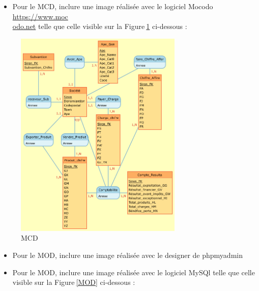 \documentclass[mstat,12pt]{unswthesis}
\begin{document}
\begin{itemize}
\tightlist
\item
  Pour le MCD, inclure une image réalisée avec le logiciel Mocodo
  \href{https://www.mocodo.net/?mcd=eNqNksFu2zAMhu96Ch0dQAOW7Zab67ZK2zTL4ixtcjEUh14FOJKhyFm3N_J9b-AX62_HaOMEAwb4Ay1SIvlLjMvNQRmvrRnxWDsywe3DQPD43R296MwRCw9Wu7AgMRzy2Ka6rnxdieGUwyfJsKMZNUsBpmrX2kj5z50ddvZLZ7-Kid5QniNNZLfEMoXyTTWUC7OM3EWpLpggiq2j0BgixhyldLClQ8uC945wnPkQ0u1_D49auYJfk7E7fdwjeNNKYfde5WJhf8GBZtlM_SYXvSj380w_b7tq_Ena3lNX5KzT05u9DcE1kOAePIIp-AZm4DuYM3bzWljnyc2c3ZbaX9btAv3CSzJbR01Il_97pi-g12sMFuAHWIIn8AxWYC24_PNp9cxGDN9Z5pMsEiLlA5gAiJUQKyFWQuwYlzG-AhHApaxvBF8h-WrNIrsrvNroXHtqH79Z05z2Ze5VTxm_nA1xoVX866VO0_bEz-uqdfqEXovcavxhQgIpe7FMG2VSTS6Qy4H48Ktm6hK9K-q_fh_Ip7OEKRVNNkN5ML5DbGExcUlxbHkfjCcDcXSlbc_wPGLXVV2Zusp0SklBGI5gPB2wN-SeTJ4=}{https://www.moc\\odo.net}
  telle que celle visible sur la Figure\(~\)\ref{MCD} ci-dessous :
\end{itemize}

\begin{figure}
\centering
\includegraphics[width=8cm,height=10cm]{MCD.png}
\caption{MCD}\label{MCD}
\end{figure}

\begin{itemize}
\item
  Pour le MOD, inclure une image réalisée avec le designer de phpmyadmin
\item
  Pour le MOD, inclure une image réalisée avec le logiciel MySQl
  \newline telle que celle visible sur la Figure\(~\)\ref{MOD}
  ci-dessous :
\end{itemize}
\end{document}
